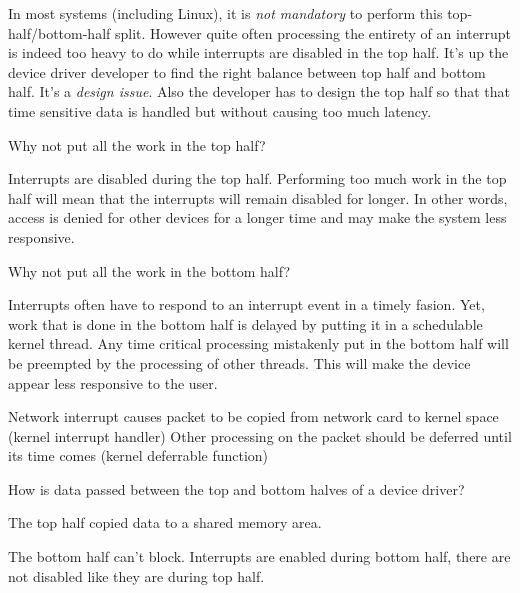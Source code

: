 In most systems (including Linux), it is \textit{not mandatory} to perform this top-half/bottom-half 
split. However quite often processing the entirety of an interrupt is indeed 
too heavy to do while interrupts are disabled in the top half. 
It's up the device driver developer to find the right balance between 
top half and bottom half. It's a \textit{design issue}. Also the developer has to design the top half 
so that that time sensitive data is handled but without causing too much latency. 

\frmrule

\begin{example}
Why not put all the work in the top half?

Interrupts are disabled during the top half. Performing too much work in the top half 
will mean that the interrupts will remain disabled for longer. In other words, 
access is denied for other devices 
for a longer time and may make the system less responsive.
\end{example}

\frmrule

\begin{example}
Why not put all the work in the bottom half?

Interrupts often have to respond to an interrupt event in a timely fasion. 
Yet, work that is done in the bottom 
half is delayed by putting it in a schedulable kernel thread. 
Any time critical processing mistakenly put 
in the bottom half will be preempted by the processing of other threads. 
This will make the device appear less responsive to the user.
\end{example}

\frmrule

\begin{example}
Network interrupt causes packet to be copied from 
network card to kernel space (kernel interrupt handler)
Other processing on the packet should be deferred until 
its time comes (kernel deferrable function)
\end{example}


\begin{example}
How is data passed between the top and bottom halves of a device driver?

The top half copied data to a shared memory area.
\end{example}

\frmrule

The bottom half can’t block. 
Interrupts are enabled during bottom half, 
there are not disabled like they are during top half.

